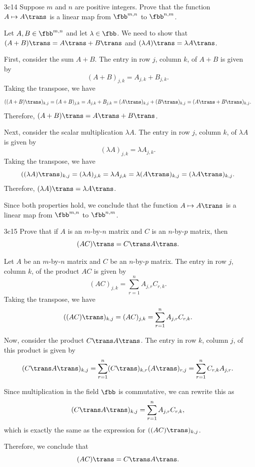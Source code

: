 \begin{exercise}{3c14}
    Suppose $m$ and $n$ are positive integers.
	Prove that the function $A \mapsto A\trans$ is a linear map from $\fbb^{m, n}$ to $\fbb^{n, m}$.
\end{exercise}

\begin{sol}
    Let $A, B \in \fbb^{m, n}$ and let $\lambda \in \fbb$.
	We need to show that $(A + B)\trans = A\trans + B\trans$ and $(\lambda A)\trans = \lambda A\trans$.

    First, consider the sum $A + B$.
	The entry in row $j$, column $k$, of $A + B$ is given by
    \[
    	(A + B)_{j, k} = A_{j, k} + B_{j, k}.
    \]
    Taking the transpose, we have
    \[
    	((A + B)\trans)_{k, j} = (A + B)_{j, k} = A_{j, k} + B_{j, k} = (A\trans)_{k, j} + (B\trans)_{k, j} = (A\trans + B\trans)_{k, j}.
    \]
    Therefore, $(A + B)\trans = A\trans + B\trans$.

    Next, consider the scalar multiplication $\lambda A$.
	The entry in row $j$, column $k$, of $\lambda A$ is given by
    \[
    	(\lambda A)_{j, k} = \lambda A_{j, k}.
    \]
    Taking the transpose, we have
    \[
    	((\lambda A)\trans)_{k, j} = (\lambda A)_{j, k} = \lambda A_{j, k} = \lambda (A\trans)_{k, j} = (\lambda A\trans)_{k, j}.
    \]
    Therefore, $(\lambda A)\trans = \lambda A\trans$.

    Since both properties hold, we conclude that the function $A \mapsto A\trans$ is a linear map from $\fbb^{m, n}$ to $\fbb^{n, m}$.
\end{sol}

\begin{exercise}{3c15}
    Prove that if $A$ is an $m$-by-$n$ matrix and $C$ is an $n$-by-$p$ matrix, then
    \[
    	(AC)\trans = C\trans A\trans.
    \]
\end{exercise}

\begin{sol}
    Let $A$ be an $m$-by-$n$ matrix and $C$ be an $n$-by-$p$ matrix.
	The entry in row $j$, column $k$, of the product $AC$ is given by
    \[
    	(AC)_{j, k} = \sum_{r = 1}^{n} A_{j, r} C_{r, k}.
    \]
    Taking the transpose, we have
    \[
    	((AC)\trans)_{k, j} = (AC)_{j, k} = \sum_{r = 1}^{n} A_{j, r} C_{r, k}.
    \]

    Now, consider the product $C\trans A\trans$.
	The entry in row $k$, column $j$, of this product is given by
    \[
    	(C\trans A\trans)_{k, j} = \sum_{r = 1}^{n} (C\trans)_{k, r} (A\trans)_{r, j} = \sum_{r = 1}^{n} C_{r, k} A_{j, r}.
    \]

    Since multiplication in the field $\fbb$ is commutative, we can rewrite this as
    \[
    	(C\trans A\trans)_{k, j} = \sum_{r = 1}^{n} A_{j, r} C_{r, k},
    \]
    which is exactly the same as the expression for $((AC)\trans)_{k, j}$.

    Therefore, we conclude that
    \[
    	(AC)\trans = C\trans A\trans.
    \]
\end{sol}

